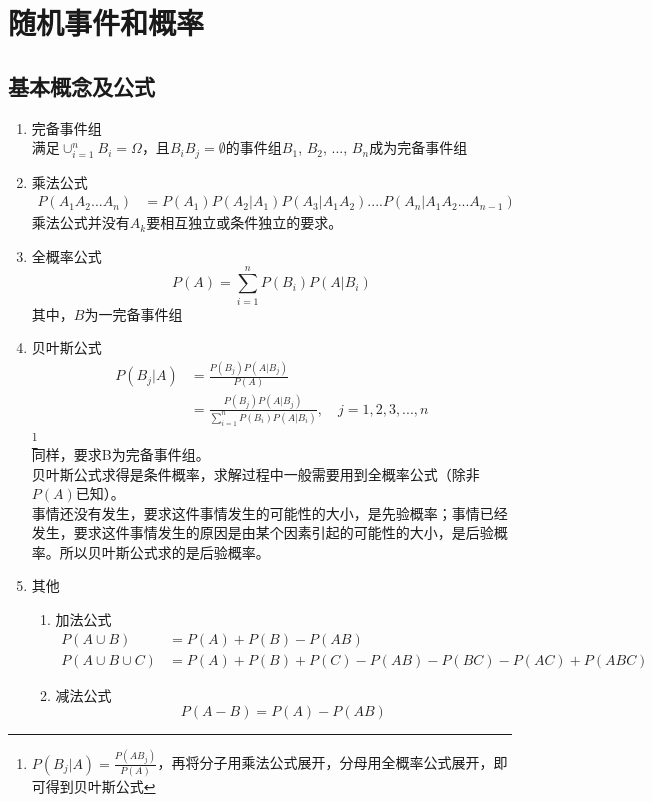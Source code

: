 \section{随机事件和概率}
\subsection{基本概念及公式}
\begin{enumerate}
	\item 完备事件组 \\
	满足$\cup_{i=1}^nB_i=\Omega$，且$B_iB_j = \emptyset$的事件组$B_1$, $B_2$, ..., $B_n$成为完备事件组
	\item 乘法公式
	\begin{align}
	P(A_1A_2...A_n) &= P(A_1)P(A_2|A_1)P(A_3|A_1A_2)....P(A_n|A_1A_2...A_{n-1})
	\end{align}
	乘法公式并没有$A_k$要相互独立或条件独立的要求。

	\item 全概率公式
	\begin{equation}
	P(A) = \sum_{i=1}^nP(B_i)P(A|B_i)
	\end{equation}
	其中，$B$为一完备事件组

	\item 贝叶斯公式
	\begin{align}
	P(B_j|A) &= \frac{P(B_j)P(A|B_j)}{P(A)} \\
	&= \frac{P(B_j)P(A|B_j)}{\sum_{i=1}^nP(B_i)P(A|B_i)},  \quad j = 1, 2, 3, ..., n
	\end{align}
	\footnote{$P(B_j|A)=\frac{P(AB_j)}{P(A)}$，再将分子用乘法公式展开，分母用全概率公式展开，即可得到贝叶斯公式} \\
	同样，要求B为完备事件组。 \\
	贝叶斯公式求得是条件概率，求解过程中一般需要用到全概率公式（除非$P(A)$已知）。 \\
	事情还没有发生，要求这件事情发生的可能性的大小，是先验概率；事情已经发生，要求这件事情发生的原因是由某个因素引起的可能性的大小，是后验概率。所以贝叶斯公式求的是后验概率。
	\item 其他
	\begin{enumerate}
		\item 加法公式
		\begin{align}
			P(A\cup B) &= P(A) + P(B) - P(AB) \\
			P(A\cup B\cup C) &= P(A)+P(B)+P(C)-P(AB)-P(BC)-P(AC) +P(ABC)
		\end{align}
		\item 减法公式
		\begin{equation}
			P(A-B) = P(A)-P(AB)
		\end{equation}
	\end{enumerate}
\end{enumerate}
